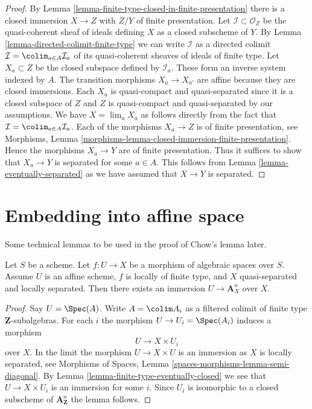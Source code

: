 \begin{proof}
By Lemma \ref{lemma-finite-type-closed-in-finite-presentation}
there is a closed immersion $X \to Z$ with $Z/Y$ of
finite presentation. Let $\mathcal{I} \subset \mathcal{O}_Z$
be the quasi-coherent sheaf of ideals defining $X$ as a closed
subscheme of $Y$. By
Lemma \ref{lemma-directed-colimit-finite-type}
we can write $\mathcal{I}$ as a directed colimit
$\mathcal{I} = \colim_{a \in A} \mathcal{I}_a$ of its
quasi-coherent sheaves of ideals of finite type.
Let $X_a \subset Z$ be the closed subspace defined by $\mathcal{I}_a$.
These form an inverse system indexed by $A$.
The transition morphisms $X_a \to X_{a'}$ are affine because
they are closed immersions. Each $X_a$ is quasi-compact and quasi-separated
since it is a closed subspace of $Z$ and $Z$ is quasi-compact and
quasi-separated by our assumptions.
We have $X = \lim_a X_a$ as follows directly from the
fact that $\mathcal{I} = \colim_{a \in A} \mathcal{I}_a$.
Each of the morphisms $X_a \to Z$ is of finite presentation, see
Morphisms, Lemma \ref{morphisms-lemma-closed-immersion-finite-presentation}.
Hence the morphisms $X_a \to Y$ are of finite presentation.
Thus it suffices to show that $X_a \to Y$ is separated for some
$a \in A$. This follows from Lemma \ref{lemma-eventually-separated}
as we have assumed that $X \to Y$ is separated.
\end{proof}






\section{Embedding into affine space}
\label{section-embedding}

\noindent
Some technical lemmas to be used in the proof of Chow's lemma later.

\begin{lemma}
\label{lemma-embedding-into-affine-over-ls-qs}
Let $S$ be a scheme. Let $f : U \to X$ be a morphism of algebraic
spaces over $S$. Assume $U$ is an affine scheme, $f$ is locally of
finite type, and $X$ quasi-separated and locally separated.
Then there exists an immersion $U \to \mathbf{A}^n_X$ over $X$.
\end{lemma}

\begin{proof}
Say $U = \Spec(A)$. Write $A = \colim A_i$ as a filtered colimit
of finite type $\mathbf{Z}$-subalgebras. For each $i$ the morphism
$U \to U_i = \Spec(A_i)$ induces a morphism
$$
U \longrightarrow X \times U_i
$$
over $X$. In the limit the morphism $U \to X \times U$ is an immersion
as $X$ is locally separated, see
Morphisms of Spaces, Lemma
\ref{spaces-morphisms-lemma-semi-diagonal}.
By Lemma \ref{lemma-finite-type-eventually-closed}
we see that $U \to X \times U_i$ is an immersion for some $i$.
Since $U_i$ is isomorphic to a closed subscheme of
$\mathbf{A}^n_{\mathbf{Z}}$ the lemma follows.
\end{proof}

